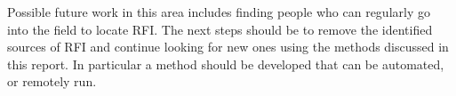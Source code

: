 \documentclass[a4paper,12pt]{article}
\begin{document}
Possible future work in this area includes finding people who can regularly go into the field to locate RFI. The next steps should be to remove the identified sources of RFI and continue looking for new ones using the methods discussed in this report. In particular a method should be developed that can be automated, or remotely run. 

                                                                                                                                                                                                                                                                                                                                                                                                                                                                                                                                                                                                                                                                                                                                                                                                                                                                                                                                                                                                                                                                                                                                                                                                                                                                                                                                                                                                                                                                                                                                                                                                                                                                                                                                                                                                                                                                                                                                                                                                                                                                                                                                                                                                                                                                                                                                                                                                                                                                                                                                                                                                                                                                                                                                                                                                                                                                                                                                                                                                                                                       
\end{document}
